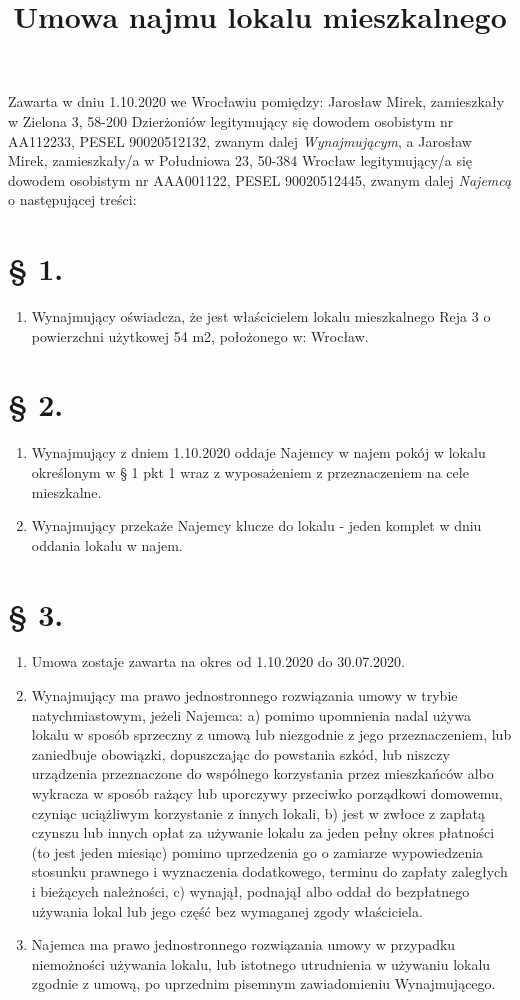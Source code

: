 \documentclass[a4paper,11pt, notitlepage]{article}
\title{Umowa najmu lokalu mieszkalnego}
\author{}
\date{}
\begin{document}
\maketitle
Zawarta w dniu 1.10.2020 we Wrocławiu pomiędzy:
Jarosław Mirek, zamieszkały w Zielona 3, 58-200 Dzierżoniów legitymujący się dowodem osobistym nr AA112233, PESEL 90020512132, zwanym dalej \textit{Wynajmującym}, a
Jarosław Mirek, zamieszkały/a w Południowa 23, 50-384 Wrocław legitymujący/a się dowodem osobistym nr AAA001122, PESEL 90020512445, zwanym dalej \textit{Najemcą} o następującej treści:
\section*{§ 1.}
    \begin{enumerate}
        \item Wynajmujący oświadcza, że jest właścicielem lokalu mieszkalnego Reja 3 o powierzchni użytkowej 54 m2, położonego w: Wrocław.
    \end{enumerate}
\section*{§ 2.}
    \begin{enumerate}
     \item Wynajmujący z dniem 1.10.2020 oddaje Najemcy w najem pokój w lokalu określonym w § 1 pkt 1 wraz z wyposażeniem z przeznaczeniem na cele mieszkalne.
    \item Wynajmujący przekaże Najemcy klucze do lokalu - jeden komplet w dniu oddania lokalu w najem.
    \end{enumerate}
\section*{§ 3.}
    \begin{enumerate}
     \item Umowa zostaje zawarta na okres od 1.10.2020 do 30.07.2020.
     \item Wynajmujący ma prawo jednostronnego rozwiązania umowy w trybie natychmiastowym, jeżeli Najemca:
        \subitem a) pomimo upomnienia nadal używa lokalu w sposób sprzeczny z umową lub niezgodnie z jego przeznaczeniem, lub zaniedbuje obowiązki, dopuszczając do powstania szkód, lub niszczy urządzenia	przeznaczone do wspólnego korzystania przez mieszkańców albo wykracza w sposób rażący lub uporczywy przeciwko porządkowi domowemu, czyniąc uciążliwym korzystanie z innych lokali,
        \subitem b) jest w zwłoce z zapłatą czynszu lub innych opłat za używanie lokalu za jeden pełny okres płatności (to jest jeden miesiąc) 	pomimo uprzedzenia go o zamiarze wypowiedzenia stosunku prawnego i wyznaczenia dodatkowego, terminu do zapłaty zaległych i bieżących należności,
        \subitem c) wynajął, podnajął albo oddał do bezpłatnego używania lokal lub jego część bez wymaganej zgody właściciela.
        \item Najemca ma prawo jednostronnego rozwiązania umowy w przypadku niemożności używania lokalu, lub istotnego utrudnienia w używaniu lokalu zgodnie z umową, po uprzednim pisemnym zawiadomieniu Wynajmującego.
    \end{enumerate}
\end{document}
